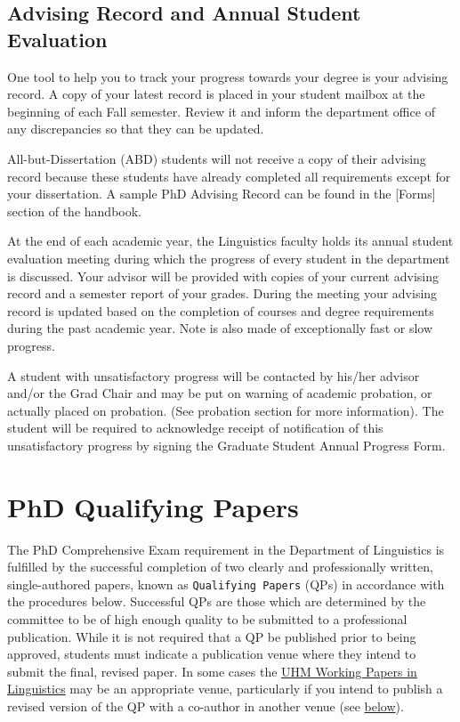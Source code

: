 \documentclass[
]{book}
\begin{document}
\hypertarget{advising-record-and-annual-student-evaluation}{%
\section{Advising Record and Annual Student Evaluation}\label{advising-record-and-annual-student-evaluation}}

One tool to help you to track your progress towards your degree is your advising record. A copy of your latest record is placed in your student mailbox at the beginning of each Fall semester. Review it and inform the department office of any discrepancies so that they can be updated.

All-but-Dissertation (ABD) students will not receive a copy of their advising record because these students have already completed all requirements except for your dissertation. A sample PhD Advising Record can be found in the {[}Forms{]} section of the handbook.

At the end of each academic year, the Linguistics faculty holds its annual student evaluation meeting during which the progress of every student in the department is discussed. Your advisor will be provided with copies of your current advising record and a semester report of your grades. During the meeting your advising record is updated based on the completion of courses and degree requirements during the past academic year. Note is also made of exceptionally fast or slow progress.

A student with unsatisfactory progress will be contacted by his/her advisor and/or the Grad Chair and may be put on warning of academic probation, or actually placed on probation. (See probation section for more information). The student will be required to acknowledge receipt of notification of this unsatisfactory progress by signing the Graduate Student Annual Progress Form.

\hypertarget{qp}{%
\chapter{PhD Qualifying Papers}\label{qp}}

The PhD Comprehensive Exam requirement in the Department of Linguistics is fulfilled by the successful completion of two clearly and professionally written, single-authored papers, known as \texttt{Qualifying\ Papers} (QPs) in accordance with the procedures below. Successful QPs are those which are determined by the committee to be of high enough quality to be submitted to a professional publication. While it is not required that a QP be published prior to being approved, students must indicate a publication venue where they intend to submit the final, revised paper. In some cases the \protect\hyperlink{wp}{UHM Working Papers in Linguistics} may be an appropriate venue, particularly if you intend to publish a revised version of the QP with a co-author in another venue (see \protect\hyperlink{wp}{below}).
\end{document}
